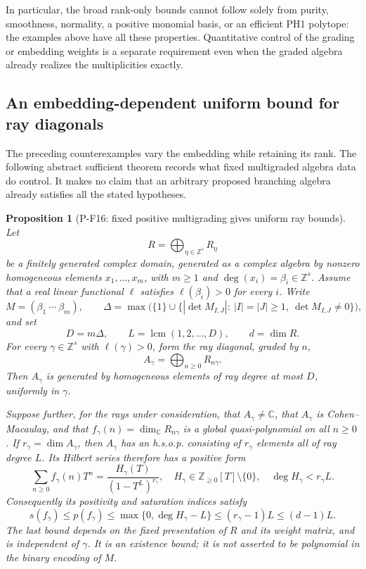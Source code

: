 \documentclass[11pt,a4paper]{article}
\newtheorem{proposition}{Proposition}[section]
\begin{document}
In particular, the broad rank-only bounds cannot follow solely from
purity, smoothness, normality, a positive monomial basis, or an
efficient PH1 polytope: the examples above have all these properties.
Quantitative control of the grading or embedding weights is a
separate requirement even when the graded algebra already realizes
the multiplicities exactly.


\subsection{An embedding-dependent uniform bound for ray diagonals}

The preceding counterexamples vary the embedding while retaining its rank.
The following abstract sufficient theorem records what fixed multigraded
algebra data do control. It makes no claim that an arbitrary proposed
branching algebra already satisfies all the stated hypotheses.

\begin{proposition}[P-F16: fixed positive multigrading gives uniform ray bounds]
\label{prop:fixedmultigrading}
Let
\[
 R=\bigoplus_{\eta\in\mathbb Z^s}R_\eta
\]
be a finitely generated complex domain, generated as a complex algebra by
nonzero homogeneous elements $x_1,\ldots,x_m$, with $m\ge1$ and
$\deg(x_i)=\beta_i\in\mathbb Z^s$.
Assume that a real linear functional $\ell$ satisfies
$\ell(\beta_i)>0$ for every $i$. Write
\[
 M=(\beta_1\ \cdots\ \beta_m),\qquad
 \Delta=\max\bigl(\{1\}\cup
 \{|\det M_{I,J}|:\ |I|=|J|\ge1,\ \det M_{I,J}\ne0\}\bigr),
\]
and set
\[
 D=m\Delta,\qquad L=\operatorname{lcm}(1,2,\ldots,D),
 \qquad d=\dim R.
 \tag{P-F16a}
\]
For every $\gamma\in\mathbb Z^s$ with $\ell(\gamma)>0$, form the ray
diagonal, graded by $n$,
\[
 A_\gamma=\bigoplus_{n\ge0} R_{n\gamma}.
\]
Then $A_\gamma$ is generated by homogeneous elements of ray degree at
most $D$, uniformly in $\gamma$.

Suppose further, for the rays under consideration, that $A_\gamma\ne\mathbb C$,
that $A_\gamma$ is Cohen--Macaulay, and that
$f_\gamma(n)=\dim_\mathbb C R_{n\gamma}$ is a global quasi-polynomial
on all $n\ge0$. If $r_\gamma=\dim A_\gamma$, then $A_\gamma$ has an
h.s.o.p. consisting of $r_\gamma$ elements all of ray degree $L$.
Its Hilbert series therefore has a positive form
\[
 \sum_{n\ge0}f_\gamma(n)T^n
 =\frac{H_\gamma(T)}{(1-T^L)^{r_\gamma}},
 \quad H_\gamma\in\mathbb Z_{\ge0}[T]\setminus\{0\},
 \quad \deg H_\gamma<r_\gamma L.
 \tag{P-F16b}
\]
Consequently its positivity and saturation indices satisfy
\[
 s(f_\gamma)\le p(f_\gamma)
 \le\max\{0,\deg H_\gamma-L\}
 \le(r_\gamma-1)L\le(d-1)L.
 \tag{P-F16c}
\]
The last bound depends on the fixed presentation of $R$ and its weight
matrix, and is independent of $\gamma$. It is an existence bound;
it is not asserted to be polynomial in the binary encoding of $M$.
\end{proposition}
\end{document}
